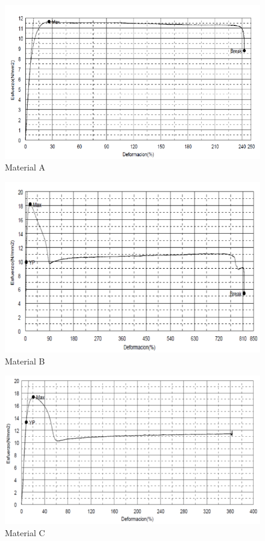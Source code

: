 \documentclass[a4paper, 11pt]{article}
\begin{document}
\begin{figure}[h!] 
\centering
\captionsetup{justification=centering}
    \includegraphics[scale=0.75]{material_a.png} 
     \caption{Material A}
    \label{material_a}
\end{figure}

\begin{figure}[h!] 
\centering
\captionsetup{justification=centering}
    \includegraphics[scale=0.75]{material_b.png} 
     \caption{Material B}
    \label{material_b}
\end{figure}

\begin{figure}[h!] 
\centering
\captionsetup{justification=centering}
    \includegraphics[scale=0.75]{material_c.png} 
     \caption{Material C}
    \label{material_c}
\end{figure}
\end{document}
